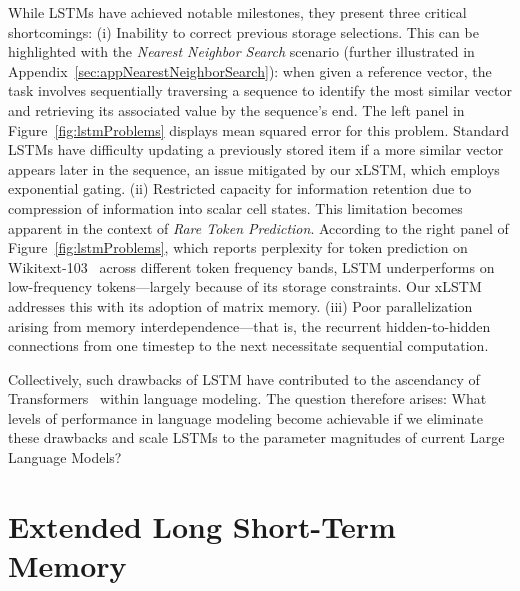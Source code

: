 While LSTMs have achieved notable milestones, they present three critical shortcomings: (i) Inability to correct previous storage selections. This can be highlighted with the 
{\it Nearest Neighbor Search} scenario (further illustrated in Appendix~\ref{sec:appNearestNeighborSearch}): when given a reference vector, the task involves sequentially traversing a sequence to identify the most similar vector and retrieving its associated value by the sequence's end. The left panel in Figure~\ref{fig:lstmProblems} displays mean squared error for this problem. Standard LSTMs have difficulty updating a previously stored item if a more similar vector appears later in the sequence, an issue mitigated by our xLSTM, which employs exponential gating. (ii) Restricted capacity for information retention due to compression of information into scalar cell states. This limitation becomes apparent in the context of {\it Rare Token Prediction}. According to the right panel of Figure~\ref{fig:lstmProblems}, which reports perplexity for token prediction on Wikitext-103~\citep{Merity:17} across different token frequency bands, LSTM underperforms on low-frequency tokens—largely because of its storage constraints. Our xLSTM addresses this with its adoption of matrix memory. (iii) Poor parallelization arising from memory interdependence—that is, the recurrent hidden-to-hidden connections from one timestep to the next necessitate sequential computation. 

Collectively, such drawbacks of LSTM have contributed to the ascendancy of Transformers~\citep{Vaswani:17} within language modeling. The question therefore arises: What levels of performance in language modeling become achievable if we eliminate these drawbacks and scale LSTMs to the parameter magnitudes of current Large Language Models?

\section{Extended Long Short-Term Memory}
\label{sec:xLSTM}

